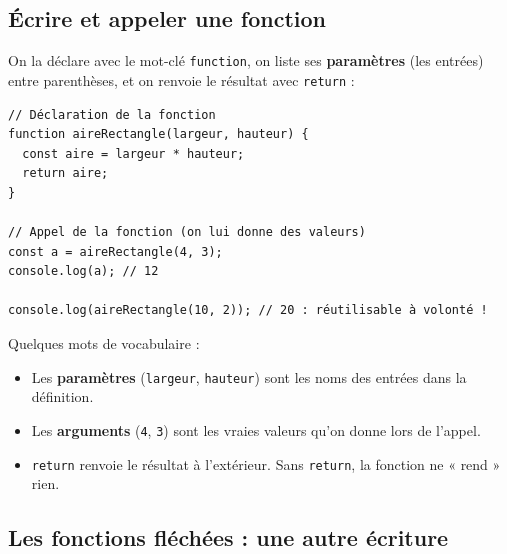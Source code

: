 \documentclass[11pt,a4paper]{article}
\newcommand{\code}[1]{\texttt{#1}}
\begin{document}
\begin{center}
\end{center}

\subsection{Écrire et appeler une fonction}

On la déclare avec le mot-clé \code{function}, on liste ses \textbf{paramètres} (les entrées) entre parenthèses, et on renvoie le résultat avec \code{return} :

\begin{lstlisting}[style=js]
// Déclaration de la fonction
function aireRectangle(largeur, hauteur) {
  const aire = largeur * hauteur;
  return aire;
}

// Appel de la fonction (on lui donne des valeurs)
const a = aireRectangle(4, 3);
console.log(a); // 12

console.log(aireRectangle(10, 2)); // 20 : réutilisable à volonté !
\end{lstlisting}

Quelques mots de vocabulaire :
\begin{itemize}[leftmargin=*,noitemsep]
  \item Les \textbf{paramètres} (\code{largeur}, \code{hauteur}) sont les noms des entrées dans la définition.
  \item Les \textbf{arguments} (\code{4}, \code{3}) sont les vraies valeurs qu'on donne lors de l'appel.
  \item \code{return} renvoie le résultat à l'extérieur. Sans \code{return}, la fonction ne « rend » rien.
\end{itemize}

\subsection{Les fonctions fléchées : une autre écriture}
\end{document}
